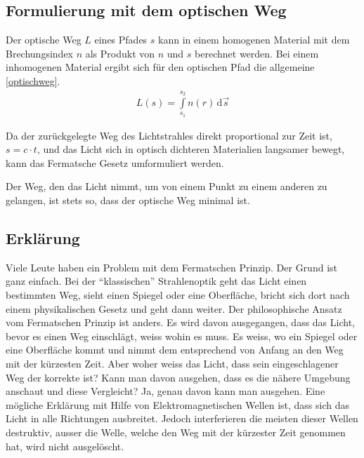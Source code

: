 \subsection{Formulierung mit dem optischen Weg}
Der optische Weg $L$  eines Pfades $s$ kann in einem homogenen Material 
mit dem Brechungsindex $n$ als Produkt von $n$ und $s$ berechnet werden.
Bei einem inhomogenen Material ergibt sich für den optischen Pfad die allgemeine \eqref{optischweg}.
\begin{align}
	L(s) = \int\limits_{s_1}^{s_2} n(r) \,\mathrm d\vec s 
	\label{optischweg}
\end{align}

Da der zurückgelegte Weg des Lichtstrahles direkt proportional zur Zeit ist, $s = c \cdot t$,
und das Licht sich in optisch dichteren Materialien langsamer bewegt,
kann das Fermatsche Gesetz umformuliert werden\cite{Definition}. 


\begin{postulat}
Der Weg, den das Licht nimmt, um von einem Punkt zu einem anderen zu gelangen, ist stets so, dass der optische Weg minimal ist.
\end{postulat}

\subsection{Erklärung}
Viele Leute haben ein Problem mit dem Fermatschen Prinzip. 
Der Grund ist ganz einfach. 
Bei der ``klassischen'' Strahlenoptik geht das Licht einen bestimmten Weg, 
sieht einen Spiegel oder eine Oberfläche, bricht sich dort nach einem 
physikalischen Gesetz und geht dann weiter.
Der philosophische Ansatz vom Fermatschen Prinzip ist anders. 
Es wird davon ausgegangen, dass das Licht, bevor es einen Weg einschlägt, 
weiss wohin es muss. Es weiss, wo ein Spiegel oder eine Oberfläche kommt und 
nimmt dem entsprechend von Anfang an den Weg mit der kürzesten Zeit.
Aber woher weiss das Licht, dass sein eingeschlagener Weg der korrekte ist?
Kann man davon ausgehen, dass es die nähere Umgebung anschaut und diese Vergleicht?
Ja, genau davon kann man ausgehen. Eine mögliche Erklärung mit Hilfe von Elektromagnetischen Wellen ist,
dass sich das Licht in alle Richtungen ausbreitet. 
Jedoch interferieren die meisten dieser Wellen destruktiv, 
ausser die Welle, welche den Weg mit der kürzester Zeit genommen hat, wird nicht ausgelöscht.

